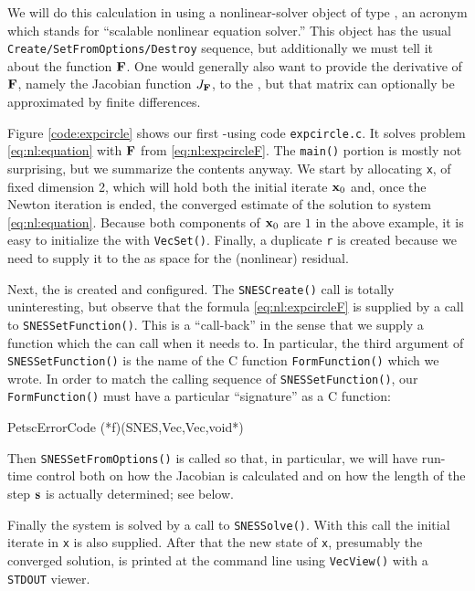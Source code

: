 We will do this calculation in \PETSc using a nonlinear-solver object of type \pSNES, an acronym which stands for ``scalable nonlinear equation solver.''  This object has the usual \texttt{Create/SetFromOptions/Destroy} sequence, but additionally we must tell it about the function $\mathbf{F}$.  One would generally also want to provide the derivative of $\mathbf{F}$, namely the Jacobian function $J_{\mathbf{F}}$, to the \pSNES, but that matrix can optionally be approximated by finite differences.

Figure \ref{code:expcircle} shows our first \pSNES-using code \texttt{expcircle.c}.  It solves problem \eqref{eq:nl:equation} with $\mathbf{F}$ from \eqref{eq:nl:expcircleF}.  The \texttt{main()} portion is mostly not surprising, but we summarize the contents anyway.  We start by allocating \pVec \texttt{x}, of fixed dimension 2, which will hold both the initial iterate $\mathbf{x}_0$ and, once the Newton iteration is ended, the converged estimate of the solution to system \eqref{eq:nl:equation}.  Because both components of $\mathbf{x}_0$ are $1$ in the above example, it is easy to initialize the \pVec with \texttt{VecSet()}.  Finally, a duplicate \pVec \texttt{r} is created because we need to supply it to the \pSNES as space for the (nonlinear) residual.

Next, the \pSNES is created and configured.  The \texttt{SNESCreate()} call is totally uninteresting, but observe that the formula \eqref{eq:nl:expcircleF} is supplied by a call to \texttt{SNESSetFunction()}.  This is a ``call-back'' in the sense that we supply a function which the \pSNES can call when it needs to.  In particular, the third argument of \texttt{SNESSetFunction()} is the name of the C function \texttt{FormFunction()} which we wrote.  In order to match the calling sequence of \texttt{SNESSetFunction()}, our \texttt{FormFunction()} must have a particular ``signature'' as a C function:
\begin{code}
PetscErrorCode (*f)(SNES,Vec,Vec,void*)
\end{code}
Then \texttt{SNESSetFromOptions()} is called so that, in particular, we will have run-time control both on how the Jacobian is calculated and on how the length of the step $\mathbf{s}$ is actually determined; see below.

\vfill
{}

Finally the system is solved by a call to \texttt{SNESSolve()}.  With this call the initial iterate in \texttt{x} is also supplied.  After that the new state of \texttt{x}, presumably the converged solution, is printed at the command line using \texttt{VecView()} with a \texttt{STDOUT} viewer.


